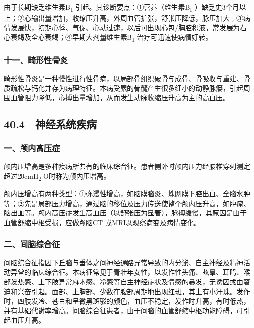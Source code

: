 由于长期缺乏维生素B\textsubscript{1}
引起。其诊断要点：①营养（维生素B\textsubscript{1}
）缺乏史3个月以上；②心输出量增加，收缩压升高，外周血管扩张，舒张压降低，脉压加大；③病情发展快，初期心悸、气促、心动过速，以后可出现心包/胸腔积液，常发展为右心衰竭及全心衰竭；④早期大剂量维生素B\textsubscript{1}
治疗可迅速使病情好转。

\subsubsection{十一、畸形性骨炎}

畸形性骨炎是一种慢性进行性骨病，以局部骨组织破骨与成骨、骨吸收与重建、骨质疏松与钙化并存为病理特征。本病受累的骨髓产生很多细小的动静脉瘘，引起周围血管阻力降低，心搏出量增加，从而发生动脉收缩压升高为主的高血压。

\protect\hypertarget{text00112.html}{}{}

\subsection{40.4　神经系统疾病}

\subsubsection{一、颅内高压症}

颅内压增高是多种疾病所共有的临床综合征。患者侧卧时颅内压力经腰椎穿刺测定超过20cmH\textsubscript{2}
O时称为颅内压增高。

颅内压增高有两种类型：①弥漫性增高，如脑膜脑炎、蛛网膜下腔出血、全脑水肿等；②先是局部压力增高，通过脑的移位及压力传送使整个颅内压升高，如肿瘤、脑出血等。颅内高压症发生高血压（以舒张压为显著），脉搏缓慢，其原因是由于血管舒缩中枢受损，应做颅脑CT
或MRI以观察病变及病情变化。

\subsubsection{二、间脑综合征}

间脑综合征指因下丘脑与垂体之间神经通路异常导致的内分泌、自主神经及精神活动异常的临床综合征。本病征常见于青壮年女性，以发作性头痛、眩晕、耳鸣、喉部发热感、上下肢异常麻木感、冷感等自主神经症状及情感的暴发，无诱因或由窘迫和兴奋引起。面部、上胸部、少数在腹部周期地出现红斑，其上有小汗珠。发作时，四肢发冷、苍白和呈微黑斑驳的颜色，血压不稳定，发作时升高，有时低热，并有基础代谢率增高。间脑综合征患者，由于间脑的血管舒缩中枢功能障碍，可引起血压升高。

\protect\hypertarget{text00113.html}{}{}

